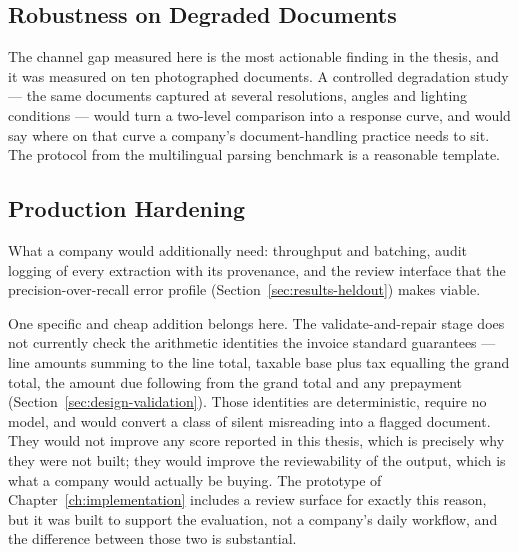 \subsection{Robustness on Degraded Documents}
\label{sec:fw-robustness}

The channel gap measured here is the most actionable finding in the thesis, and it was measured on
ten photographed documents. A controlled degradation study --- the same documents captured at
several resolutions, angles and lighting conditions --- would turn a two-level comparison into a
response curve, and would say where on that curve a company's document-handling practice needs to
sit. The protocol from the multilingual parsing benchmark \parencite{mdpbench2026} is a reasonable
template.

\subsection{Production Hardening}
\label{sec:fw-production}

What a company would additionally need: throughput and batching, audit logging of every extraction
with its provenance, and the review interface that the precision-over-recall error profile
(Section~\ref{sec:results-heldout}) makes viable.

One specific and cheap addition belongs here. The validate-and-repair stage does not currently
check the arithmetic identities the invoice standard guarantees --- line amounts summing to the
line total, taxable base plus tax equalling the grand total, the amount due following from the
grand total and any prepayment (Section~\ref{sec:design-validation}). Those identities are
deterministic, require no model, and would convert a class of silent misreading into a flagged
document. They would not improve any score reported in this thesis, which is precisely why they
were not built; they would improve the reviewability of the output, which is what a company would
actually be buying. The prototype of
Chapter~\ref{ch:implementation} includes a review surface for exactly this reason, but it was
built to support the evaluation, not a company's daily workflow, and the difference between
those two is substantial.
